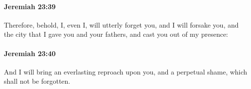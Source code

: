 		\paragraph{Jeremiah 23:39} %
			\label{JEREMIAH-23-39}

			Therefore, behold, I, even I, will utterly forget you, and I will forsake you, and the city that I gave you and your fathers, and cast you out of my presence:


		\paragraph{Jeremiah 23:40} %
			\label{JEREMIAH-23-40}

			And I will bring an everlasting reproach upon you, and a perpetual shame, which shall not be forgotten.

